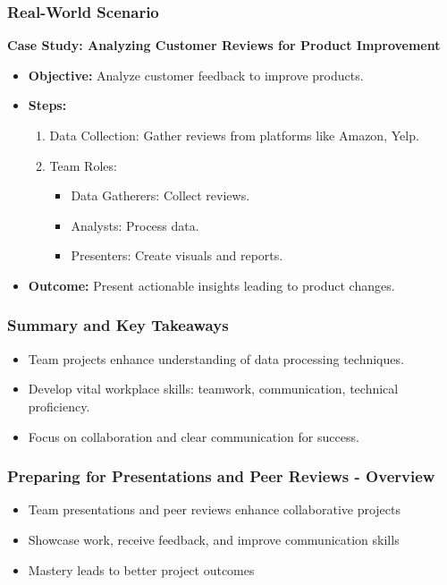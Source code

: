 \documentclass{beamer}
\begin{document}
\begin{frame}[fragile]
    \frametitle{Real-World Scenario}
    \textbf{Case Study: Analyzing Customer Reviews for Product Improvement}
    \begin{itemize}
        \item \textbf{Objective:} Analyze customer feedback to improve products.
        \item \textbf{Steps:}
            \begin{enumerate}
                \item Data Collection: Gather reviews from platforms like Amazon, Yelp.
                \item Team Roles:
                    \begin{itemize}
                        \item Data Gatherers: Collect reviews.
                        \item Analysts: Process data.
                        \item Presenters: Create visuals and reports.
                    \end{itemize}
            \end{enumerate}
        \item \textbf{Outcome:} Present actionable insights leading to product changes.
    \end{itemize}
\end{frame}

\begin{frame}[fragile]
    \frametitle{Summary and Key Takeaways}
    \begin{itemize}
        \item Team projects enhance understanding of data processing techniques.
        \item Develop vital workplace skills: teamwork, communication, technical proficiency.
        \item Focus on collaboration and clear communication for success.
    \end{itemize}
\end{frame}

\begin{frame}[fragile]
    \frametitle{Preparing for Presentations and Peer Reviews - Overview}
    \begin{itemize}
        \item Team presentations and peer reviews enhance collaborative projects
        \item Showcase work, receive feedback, and improve communication skills
        \item Mastery leads to better project outcomes
    \end{itemize}
\end{frame}
\end{document}
